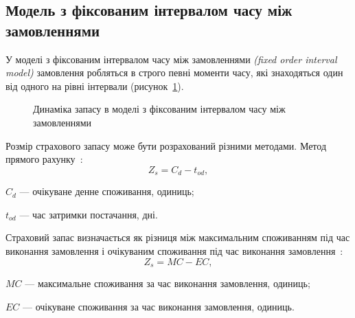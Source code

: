 \subsection{Модель з фіксованим інтервалом часу між замовленнями}
У моделі з фіксованим інтервалом часу між замовленнями  \textit{(fixed order interval model)} замовлення робляться в строго певні моменти часу, які знаходяться один від одного на рівні інтервали (рисунок~\ref{fig:model_fi:dynamic}).

\begin{figure}[H]
  \centering
{}
  \captionsetup{justification=centering}
  \caption{Динаміка запасу в моделі з фіксованим інтервалом часу між замовленнями}
  \label{fig:model_fi:dynamic}
\end{figure}

Розмір страхового запасу може бути розрахований різними методами.
Метод прямого рахунку~\cite{Sterligova2008}:
\begin{equation} \label{eq:model_fs:zs1}
Z_s=C_d-t_{od}
,
\end{equation}
\begin{description}
	\item[де] $C_d$ --- очікуване денне споживання, одиниць;
	\item $t_{od}$ --- час затримки постачання, дні.
\end{description}

Страховий запас визначається як різниця між максимальним споживанням під час виконання замовлення і очікуваним споживання під час виконання замовлення~\cite{Sterligova2008}:
\begin{equation} \label{eq:model_fs:zs2}
Z_s=MC-EC
,
\end{equation}
\begin{description}
	\item[де] $MC$ --- максимальне споживання за час виконання замовлення, одиниць;
	\item $EC$ --- очікуване споживання за час виконання замовлення, одиниць.
\end{description}

